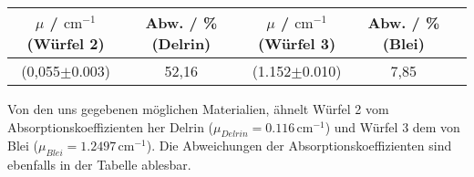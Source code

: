 \begin{center}
    \label{tab:Erg}
    \begin{tabular}{c c c c c}
        \toprule
        $\mu$ / $\text{cm}^{-1}$ (Würfel 2) & Abw. / \% (Delrin) & $\mu$ / $\text{cm}^{-1}$ (Würfel 3) & Abw. / \% (Blei) \\
        \midrule
        (0,055$\pm$0.003) & 52,16 & (1.152$\pm$0.010) & 7,85 \\
        \bottomrule
    \end{tabular}
\end{center}
Von den uns gegebenen möglichen Materialien, ähnelt Würfel 2 vom Absorptionskoeffizienten her Delrin ($\mu_{Delrin}=0.116\,\text{cm}^{-1}$)
und Würfel 3 dem von Blei ($\mu_{Blei}=1.2497\,\text{cm}^{-1}$). Die Abweichungen der Absorptionskoeffizienten sind ebenfalls in der Tabelle ablesbar.

